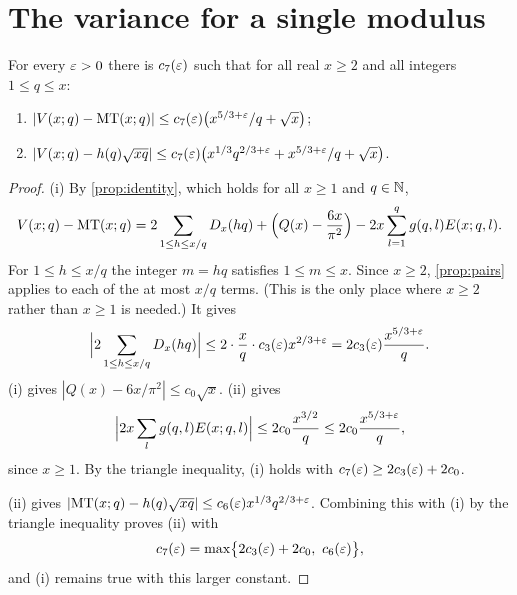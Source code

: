 \section{The variance for a single modulus}\label{sec:single}

\begin{proposition}\label{prop:single}
For every $\varepsilon>0$ there is $c_7(\varepsilon)$ such that for all real $x\ge2$ and all integers $1\le q\le x$:
\begin{enumerate}[label=\textup{(\roman*)}]
\item $|V(x;q)-\mathrm{MT}(x;q)|\le c_7(\varepsilon)\bigl(x^{5/3+\varepsilon}/q+\sqrt x\bigr)$;
\item $|V(x;q)-h(q)\sqrt{xq}|\le c_7(\varepsilon)\bigl(x^{1/3}q^{2/3+\varepsilon}+x^{5/3+\varepsilon}/q+\sqrt x\bigr)$.
\end{enumerate}
\end{proposition}

\begin{proof}
(i) By \cref{prop:identity}, which holds for all $x\ge1$ and $q\in\mathbb{N}$,
\[
V(x;q)-\mathrm{MT}(x;q)=2\sum_{1\le h\le x/q}D_x(hq)+\Bigl(Q(x)-\frac{6x}{\pi^2}\Bigr)-2x\sum_{l=1}^qg(q,l)E(x;q,l).
\]
For $1\le h\le x/q$ the integer $m=hq$ satisfies $1\le m\le x$. Since $x\ge2$, \cref{prop:pairs} applies to each of the at most $x/q$ terms. (This is the only place where $x\ge2$ rather than $x\ge1$ is needed.) It gives
\[
\Bigl|2\sum_{1\le h\le x/q}D_x(hq)\Bigr|\le2\cdot\frac xq\cdot c_3(\varepsilon)x^{2/3+\varepsilon}=2c_3(\varepsilon)\frac{x^{5/3+\varepsilon}}q .
\]
(i) gives $|Q(x)-6x/\pi^2|\le c_0\sqrt x$. (ii) gives
\[
\Bigl|2x\sum_lg(q,l)E(x;q,l)\Bigr|\le2c_0\frac{x^{3/2}}q\le2c_0\frac{x^{5/3+\varepsilon}}q,
\]
since $x\ge1$. By the triangle inequality, (i) holds with $c_7(\varepsilon)\ge2c_3(\varepsilon)+2c_0$.

(ii)  gives $|\mathrm{MT}(x;q)-h(q)\sqrt{xq}|\le c_6(\varepsilon)x^{1/3}q^{2/3+\varepsilon}$. Combining this with (i) by the triangle inequality proves (ii) with
\[
c_7(\eps)=\max\bigl\{2c_3(\eps)+2c_0,\ c_6(\eps)\bigr\},
\]
and (i) remains true with this larger constant.
\end{proof}
